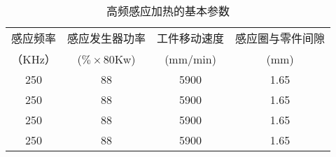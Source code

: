 \begin{table}[htbp]
    \centering
    \caption{高频感应加热的基本参数}
    \small
    \begin{tabular}{c c c c}
    \toprule
    感应频率 &感应发生器功率 & 工件移动速度  &感应圈与零件间隙\\
    （KHz）&($\% \times$80Kw) &(mm/min)  &(mm)\\
    \midrule
    250 &88 &5900 &1.65\\
    
    250 &88 &5900 &1.65\\
    
    250 &88 &5900 &1.65\\
    
    250 &88 &5900 &1.65\\
    
    \bottomrule
    \end{tabular}
    \end{table}